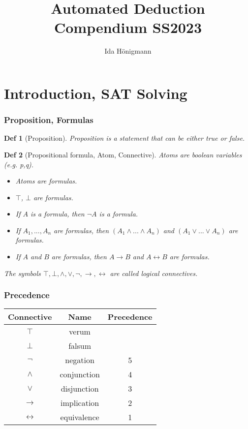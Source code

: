 \documentclass[]{article}
\newtheorem*{definition*}{Def}
\begin{document}
	
\title{Automated Deduction Compendium SS2023}
\author{Ida Hönigmann}

\maketitle

\section{Introduction, SAT Solving}

\subsubsection{Proposition, Formulas}
\begin{definition*}[Proposition]
	Proposition is a statement that can be either true or false.
\end{definition*}

\begin{definition*}[Propositional formula, Atom, Connective]
	Atoms are boolean variables (e.g. p,q).
	
	\begin{itemize}
		\item Atoms are formulas.
		\item $\top$, $\bot$ are formulas.
		\item If $A$ is a formula, then $\lnot A$ is a formula.
		\item If $A_1, ..., A_n$ are formulas, then $(A_1 \land ... \land A_n)$ and $(A_1 \lor ... \lor A_n)$ are formulas.
		\item If $A$ and $B$ are formulas, then $A \rightarrow B$ and $A \leftrightarrow B$ are formulas.
	\end{itemize}

	The symbols $\top, \bot, \land, \lor, \lnot, \rightarrow, \leftrightarrow$ are called logical connectives.
\end{definition*}

\subsubsection{Precedence}
\begin{center}
	\begin{tabular}{|c c c|}
		\hline
		Connective & Name & Precedence \\
		\hline
		$\top$            & verum       &   \\  
		$\bot$            & falsum      &   \\
		$\lnot$           & negation    & 5 \\  
		$\land$           & conjunction & 4 \\
		$\lor$            & disjunction & 3 \\  
		$\rightarrow$     & implication & 2 \\
		$\leftrightarrow$ & equivalence & 1 \\  
		\hline
	\end{tabular}
\end{center}
\end{document}
